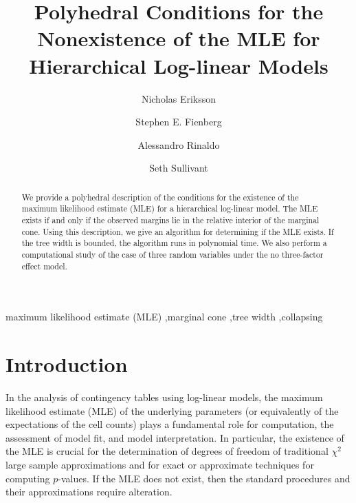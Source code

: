 \documentclass{elsart}
\begin{document}
\begin{frontmatter}
\title{Polyhedral Conditions for the Nonexistence of the MLE  for Hierarchical Log-linear Models}

\author[Berkeley]{Nicholas Eriksson}
\author[CMU,CMU2]{Stephen E. Fienberg}
\author[CMU]{Alessandro Rinaldo}
\author[Berkeley]{Seth Sullivant}
\address[Berkeley]{Department of Mathematics, University of
  California, Berkeley }
\address[CMU]{Department of Statistics, Carnegie Mellon University}
\address[CMU2]{Center for Automated Learning and Discovery and Center for Computer and Communication Security, Carnegie Mellon University} 

\begin{abstract}
We provide a polyhedral description of the conditions for the existence of the
maximum likelihood estimate (MLE) for a hierarchical log-linear model. 
The MLE exists if and only if the
observed margins lie in the relative interior of the marginal cone.
Using this description, we give an algorithm for determining if the
MLE exists.  If the tree width is bounded, the
algorithm runs in polynomial time.  We also perform a computational
study of the case of three random variables under the no three-factor
effect model.
\end{abstract}

\begin{keyword}
maximum likelihood estimate (MLE) \sep marginal cone \sep tree width \sep collapsing
\end{keyword}

\end{frontmatter}



\section{Introduction}
 
In the analysis of contingency tables using log-linear models, 
the maximum likelihood estimate  (MLE) of  the underlying parameters 
(or equivalently of the expectations of the cell counts) 
plays a fundamental role for  computation, the assessment of
model fit, and model interpretation.  In particular, the existence of
the MLE is 
crucial for the determination of degrees of freedom  of  traditional
$\chi^2$ large sample 
approximations \citep[see, for example,][]{BFH75} and for exact or
approximate techniques for computing $p$-values.  If the MLE
does not exist, then the standard procedures and their approximations require alteration.
\end{document}
